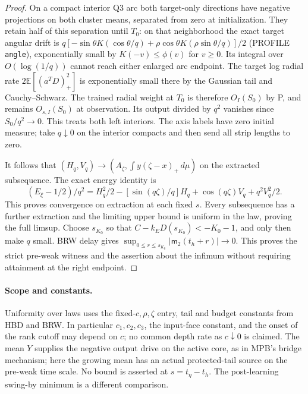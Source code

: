 \documentclass[11pt]{article}
\newcommand{\dd}{\,d}
\begin{document}
\begin{proof}
On a compact interior Q3 arc both target-only directions have
negative projections on both cluster means, separated from zero
at initialization. They retain half of this separation until $T_0$:
on that neighborhood the exact target angular drift is
$q[-\sin\theta K(\cos\theta/q)+\rho\cos\theta
K(\rho\sin\theta/q)]/2$ (PROFILE \texttt{angle}), exponentially
small by $K(-v)\le\phi(v)$ for $v\ge0$. Its integral over
$O(\log(1/q))$ cannot reach either enlarged arc endpoint.
The target log radial rate $2\mathbb E[(a^TD)_+^2]$ is exponentially
small there by the Gaussian tail and Cauchy--Schwarz. The trained
radial weight at $T_0$ is therefore $O_I(S_0)$ by P, and remains
$O_{s,I}(S_0)$ at observation. Its output divided by $q^2$
vanishes since $S_0/q^2\to0$. This treats both left interiors.
The axis labels have zero initial measure; take $q\downarrow0$ on
the interior compacts and then send all strip lengths to zero.

It follows that $(H_q,V_q)\to(A_\zeta,\int y(\zeta-x)_+\dd\mu)$
on the extracted subsequence. The exact energy identity is
\[
 (E_\xi-1/2)/q^2=H_q^2/2-[\sin(q\zeta)/q]H_q
                 +\cos(q\zeta)V_q+q^2 V_q^2/2 .
\]
This proves convergence on extraction at each fixed $s$. Every
subsequence has a further extraction and the limiting upper bound
is uniform in the law, proving the full limsup. Choose $s_{K_0}$
so that $C-k_ED(s_{K_0})<-K_0-1$, and only then make $q$ small.
BRW delay gives $\sup_{0\le r\le s_{K_0}}|\mathsf m_2(t_h+r)|\to0$.
This proves the strict pre-weak witness and the assertion about
the infimum without requiring attainment at the right endpoint.
\end{proof}

\paragraph{Scope and constants.}
Uniformity over laws uses the fixed-$c,\rho,\zeta$ entry, tail and
budget constants from HBD and BRW. In particular $c_1,c_2,c_3$,
the input-face constant, and the onset of the rank cutoff may
depend on $c$; no common depth rate as $c\downarrow0$ is claimed.
The mean $Y$ supplies the negative output drive on the active core,
as in MPB's bridge mechanism; here the growing mean has an actual
protected-tail source on the pre-weak time scale. No bound is
asserted at $s=t_\eta-t_h$. The post-learning swing-by minimum is
a different comparison.
\end{document}
